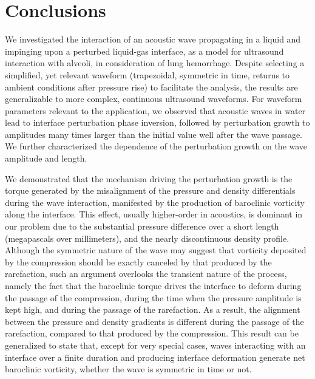 \documentclass{jfm}%
\begin{document}
\section{\label{sec:conclusions}Conclusions}
We investigated the interaction of an acoustic wave propagating in a
liquid and impinging upon a perturbed liquid-gas interface, as a model
for ultrasound interaction with alveoli, in consideration of lung
hemorrhage.  Despite selecting a simplified, yet relevant waveform
(trapezoidal, symmetric in time, returns to ambient conditions after
pressure rise) to facilitate the analysis, the results are
generalizable to more complex, continuous ultrasound waveforms.  For
waveform parameters relevant to the application, we observed that
acoustic waves in water lead to interface perturbation phase
inversion, followed by perturbation growth to amplitudes many times
larger than the initial value well after the wave passage. We further
characterized the dependence of the perturbation growth on the wave
amplitude and length.

We demonstrated that the mechanism driving the perturbation growth is
the torque generated by the misalignment of the pressure and density
differentials during the wave interaction, manifested by the
production of baroclinic vorticity along the interface.  This effect,
usually higher-order in acoustics, is dominant in our problem due to
the substantial pressure difference over a short length (megapascals
over millimeters), and the nearly discontinuous density
profile. Although the symmetric nature of the wave may suggest that
vorticity deposited by the compression should be exactly canceled by
that produced by the rarefaction, such an argument overlooks the
transient nature of the process, namely the fact that the baroclinic
torque drives the interface to deform during the passage of the
compression, during the time when the pressure amplitude is kept high, and
during the passage of the rarefaction. As a result, the alignment
between the pressure and density gradients is different during the
passage of the rarefaction, compared to that produced by the
compression. This result can be generalized to state that, except for
very special cases, waves interacting with an interface over a finite
duration and producing interface deformation generate net baroclinic
vorticity, whether the wave is symmetric in time or not.
\end{document}
